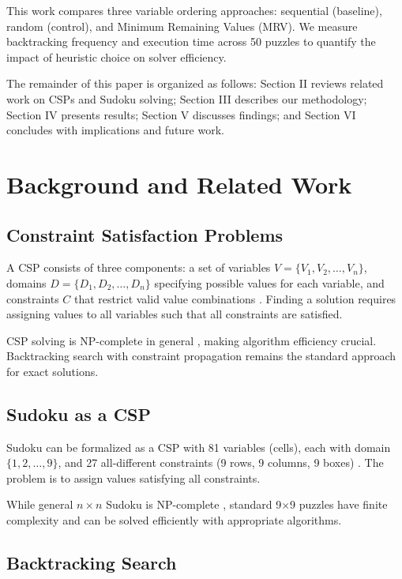 \documentclass[conference]{IEEEtran}
\begin{document}
This work compares three variable ordering approaches: sequential (baseline), random (control), and Minimum Remaining Values (MRV). We measure backtracking frequency and execution time across 50 puzzles to quantify the impact of heuristic choice on solver efficiency.

The remainder of this paper is organized as follows: Section II reviews related work on CSPs and Sudoku solving; Section III describes our methodology; Section IV presents results; Section V discusses findings; and Section VI concludes with implications and future work.

\section{Background and Related Work}

\subsection{Constraint Satisfaction Problems}

A CSP consists of three components: a set of variables $V = \{V_1, V_2, \ldots, V_n\}$, domains $D = \{D_1, D_2, \ldots, D_n\}$ specifying possible values for each variable, and constraints $C$ that restrict valid value combinations \cite{russell_norvig}. Finding a solution requires assigning values to all variables such that all constraints are satisfied.

CSP solving is NP-complete in general \cite{yato2003}, making algorithm efficiency crucial. Backtracking search with constraint propagation remains the standard approach for exact solutions.

\subsection{Sudoku as a CSP}

Sudoku can be formalized as a CSP with 81 variables (cells), each with domain $\{1, 2, \ldots, 9\}$, and 27 all-different constraints (9 rows, 9 columns, 9 boxes) \cite{simonis2005}. The problem is to assign values satisfying all constraints.

While general $n \times n$ Sudoku is NP-complete \cite{yato2003}, standard 9×9 puzzles have finite complexity and can be solved efficiently with appropriate algorithms.

\subsection{Backtracking Search}
\end{document}
